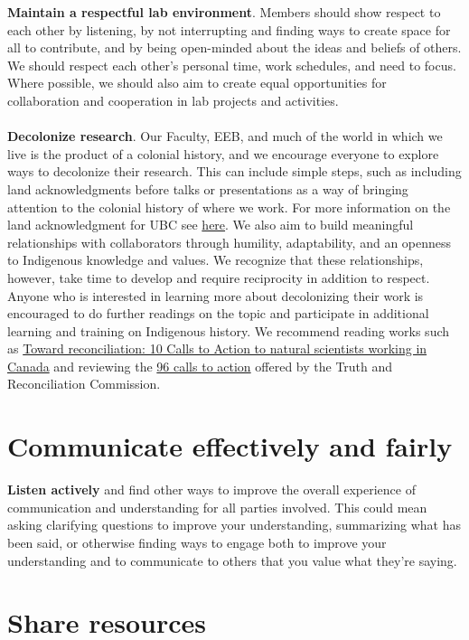\documentclass[11pt,a4paper,oneside]{article}
\begin{document}
\textbf{Maintain a respectful lab environment}. Members should show respect to each other by listening, by not interrupting and finding ways to create space for all to contribute, and by being open-minded about the ideas and beliefs of others. We should respect each other’s personal time, work schedules, and need to focus. Where possible, we should also aim to create equal opportunities for collaboration and cooperation in lab projects and activities.\\
\\
\noindent
\textbf{Decolonize research}. Our Faculty, EEB, and much of the world in which we live is the product of a colonial history, and we encourage everyone to explore ways to decolonize their research. This can include simple steps, such as including land acknowledgments before talks or presentations as a way of bringing attention to the colonial history of where we work. For more information on the land acknowledgment for UBC see \href{https://vpfo.ubc.ca/2021/02/what-is-a-land-acknowledgement}{here}. We also aim to build meaningful relationships with collaborators through humility, adaptability, and an openness to Indigenous knowledge and values. We recognize that these relationships, however, take time to develop and require reciprocity in addition to respect. Anyone who is interested in learning more about decolonizing their work is encouraged to do further readings on the topic and participate in additional learning and training on Indigenous history. We recommend reading works such as \href{https://www.facetsjournal.com/doi/10.1139/facets-2020-0005}{Toward reconciliation: 10 Calls to Action to natural scientists working in Canada} and reviewing the \href{http://trc.ca/assets/pdf/Calls_to_Action_English2.pdf}{96 calls to action} offered by the Truth and Reconciliation Commission.

\section{Communicate effectively and fairly}

\textbf{Listen actively} and find other ways to improve the overall experience of communication and understanding for all parties involved. This could mean asking clarifying questions to improve your understanding, summarizing what has been said, or otherwise finding ways to engage both to improve your understanding and to communicate to others that you value what they’re saying.

\section{Share resources}
\end{document}
